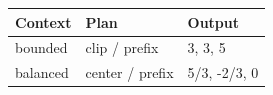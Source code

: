 \begin{tabular}{lll}
\toprule Context & Plan & Output \\
\midrule
bounded & clip / prefix & 3, 3, 5 \\
balanced & center / prefix & 5/3, -2/3, 0 \\
\bottomrule
\end{tabular}
